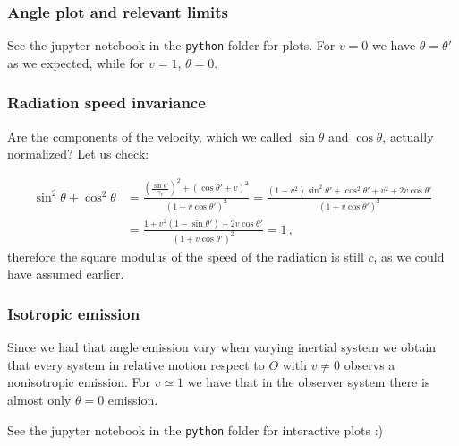 \documentclass[main.tex]{subfiles}
\begin{document}
\subsubsection{Angle plot and relevant limits}
See the jupyter notebook in the \texttt{python} folder for plots.
For $v=0$ we have $\theta=\theta'$ as we expected, while for $v=1$, $\theta = 0$.

\subsubsection{Radiation speed invariance}

Are the components of the velocity, which we called \(\sin \theta\) and \(\cos \theta \), actually normalized? Let us check:

\begin{subequations}
\begin{align}
    \sin^2\theta + \cos^2\theta &= \frac{(\frac{\sin\theta'}{\gamma_v})^2 + (\cos\theta' + v)^2}{(1 + v\cos\theta')^2} = \frac{(1-v^2)\sin^2\theta' + \cos^2\theta' + v^2 + 2v\cos\theta'}{(1 + v\cos\theta')^2} \\
    &= \frac{1+v^2(1-\sin\theta')+2v\cos\theta'}{(1 + v\cos\theta')^2} = 1 \,,
\end{align}
\end{subequations}
%
therefore the square modulus of the speed of the radiation is still \(c\), as we could have assumed earlier.

\subsubsection{Isotropic emission}

Since we had that angle emission vary when varying inertial system we obtain that every system in relative motion respect to $O$ with $v\neq 0$ observs a nonisotropic emission. For $v\simeq 1$ we have that in the observer system there is almost only $\theta = 0$ emission.

See the jupyter notebook in the \texttt{python} folder for interactive plots :)
\end{document}

